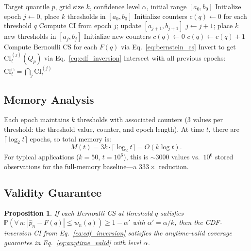 \documentclass{article}
\newcommand{\Qp}{Q_p}
\newcommand{\CI}{\mathrm{CI}}
\renewcommand{\Pr}{\mathbb{P}}
\newcommand{\ours}{\textsc{AdaQuantCS}}
\newtheorem{proposition}{Proposition}
\begin{document}
\begin{algorithm}[t]
\caption{\ours{}: Adaptive Quantile Confidence Sequences}
\label{alg:adaquantcs}
\begin{algorithmic}[1]
\REQUIRE Target quantile $p$, grid size $k$, confidence level $\alpha$, initial range $[a_0, b_0]$
\STATE Initialize epoch $j \leftarrow 0$, place $k$ thresholds in $[a_0, b_0]$
\STATE Initialize counters $c(q) \leftarrow 0$ for each threshold $q$
        \STATE Compute CI from epoch $j$; update $[a_{j+1}, b_{j+1}]$
        \STATE $j \leftarrow j + 1$; place $k$ new thresholds in $[a_j, b_j]$
        \STATE Initialize new counters $c(q) \leftarrow 0$
    \ENDIF
            \STATE $c(q) \leftarrow c(q) + 1$
        \ENDIF
    \ENDFOR
    \STATE Compute Bernoulli CS for each $F(q)$ via Eq.~\eqref{eq:bernstein_cs}
    \STATE Invert to get $\CI_t^{(j)}(\Qp)$ via Eq.~\eqref{eq:cdf_inversion}
    \STATE Intersect with all previous epochs: $\CI_t^{\cap} = \bigcap_j \CI_t^{(j)}$
\ENDFOR
\end{algorithmic}
\end{algorithm}

\subsection{Memory Analysis}

Each epoch maintains $k$ thresholds with associated counters (3 values per threshold: the threshold value, counter, and epoch length). At time $t$, there are $\lceil\log_2 t\rceil$ epochs, so total memory is:
\begin{equation}
    M(t) = 3k \cdot \lceil\log_2 t\rceil = O(k \log t).
\end{equation}
For typical applications ($k = 50$, $t = 10^6$), this is $\sim$3000 values vs.\ $10^6$ stored observations for the full-memory baseline---a $333\times$ reduction.

\subsection{Validity Guarantee}

\begin{proposition}
\label{prop:validity}
If each Bernoulli CS at threshold $q$ satisfies $\Pr(\forall\, n : |\hat{p}_n - F(q)| \leq w_n(q)) \geq 1 - \alpha'$ with $\alpha' = \alpha / k$, then the CDF-inversion CI from Eq.~\eqref{eq:cdf_inversion} satisfies the anytime-valid coverage guarantee in Eq.~\eqref{eq:anytime_valid} with level $\alpha$.
\end{proposition}
\end{document}
